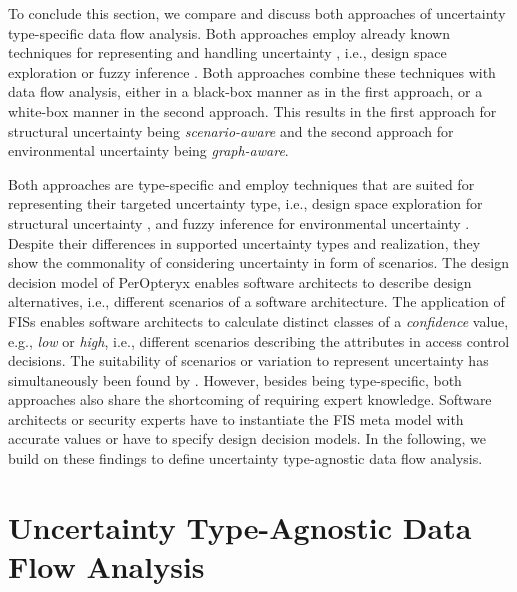 To conclude this section, we compare and discuss both approaches of uncertainty type-specific data flow analysis.
Both approaches employ already known techniques for representing and handling uncertainty \cite{sobhy_evaluation_2021,troya_uncertainty_2021}, i.e., design space exploration \cite{koziolek_peropteryx_2011,koziolek_automated_2011} or fuzzy inference \cite{klir_fuzzy_1995}.
Both approaches combine these techniques with data flow analysis, either in a black-box manner as in the first approach, or a white-box manner in the second approach.
This results in the first approach for structural uncertainty being \emph{scenario-aware} and the second approach for environmental uncertainty being \emph{graph-aware}.

Both approaches are type-specific and employ techniques that are suited for representing their targeted uncertainty type, i.e., design space exploration for structural uncertainty \cite{sobhy_evaluation_2021,troya_uncertainty_2021}, and fuzzy inference for environmental uncertainty \cite{cheng_fuzzy_2007,esfahani_guidearch_2013,hosmer_using_1992}.
Despite their differences in supported uncertainty types and realization, they show the commonality of considering uncertainty in form of scenarios.
The design decision model of PerOpteryx enables software architects to describe design alternatives, i.e., different scenarios of a software architecture.
The application of \acp{FIS} enables software architects to calculate distinct classes of a \emph{confidence} value, e.g., \emph{low} or \emph{high}, i.e., different scenarios describing the attributes in access control decisions.
The suitability of scenarios or variation \cite{walter_architecture-based_2023} to represent uncertainty has simultaneously been found by \textcite{troya_uncertainty_2021}.
However, besides being type-specific, both approaches also share the shortcoming of requiring expert knowledge.
Software architects or security experts have to instantiate the \ac{FIS} meta model with accurate values or have to specify design decision models.
In the following, we build on these findings to define uncertainty type-agnostic data flow analysis.






\section{Uncertainty Type-Agnostic Data Flow Analysis}%
\label{sec:confidentialityanalysis:typeagnostic}

